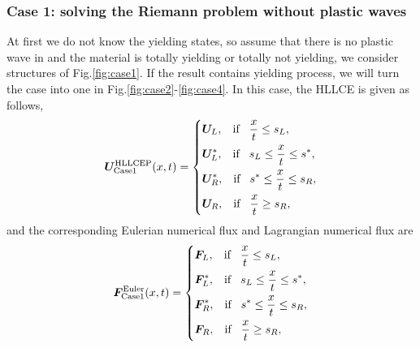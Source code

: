 \documentclass{article}
\numberwithin{equation}{section}
\numberwithin{table}{section}
\begin{document}
\subsubsection{Case 1: solving the Riemann problem without  plastic waves}\label{sec:case1}
At first we do not know the yielding states, so assume that there is no plastic wave in  and the material is totally yielding or totally not yielding, we consider structures of Fig.\ref{fig:case1}. If the result contains yielding process, we will turn the case into one in Fig.\ref{fig:case2}-\ref{fig:case4}.
%
In this case, the HLLCE is given as follows,
\begin{equation}\label{eq:HLLCEP}
  \bm{U}^{\text{HLLCEP}}_{\text{Case1}}(x,t) = \left\{ \begin{aligned}
		& \bm{U}_L, \hspace{0.3cm} \text{if} \hspace{0.3cm} \frac{x}{t}\le s_L, \\
		& \bm{U}_L^*, \hspace{0.3cm} \text{if} \hspace{0.3cm} s_L\le \frac{x}{t} \le s^*, \\
		& \bm{U}_R^*, \hspace{0.3cm} \text{if} \hspace{0.3cm} s^*\le \frac{x}{t} \le s_R,\\
		& \bm{U}_R, \hspace{0.3cm} \text{if} \hspace{0.3cm} \frac{x}{t}\ge s_R, \\
	  \end{aligned}
	\right.
  \end{equation}
  and the corresponding Eulerian numerical flux and Lagrangian numerical flux are 
 \begin{equation}
	\bm{F}^{\text{Euler}}_{\text{Case1}}(x,t) = \left\{ \begin{aligned}
		& \bm{F}_L, \hspace{0.3cm} \text{if} \hspace{0.3cm} \frac{x}{t}\le s_L, \\
		& \bm{F}_L^*, \hspace{0.3cm} \text{if} \hspace{0.3cm} s_L\le \frac{x}{t} \le s^*, \\
		& \bm{F}_R^*, \hspace{0.3cm} \text{if} \hspace{0.3cm} s^*\le \frac{x}{t} \le s_R,\\
		& \bm{F}_R, \hspace{0.3cm} \text{if} \hspace{0.3cm} \frac{x}{t}\ge s_R, \\
	  \end{aligned}
	\right.
  \end{equation}
\end{document}
